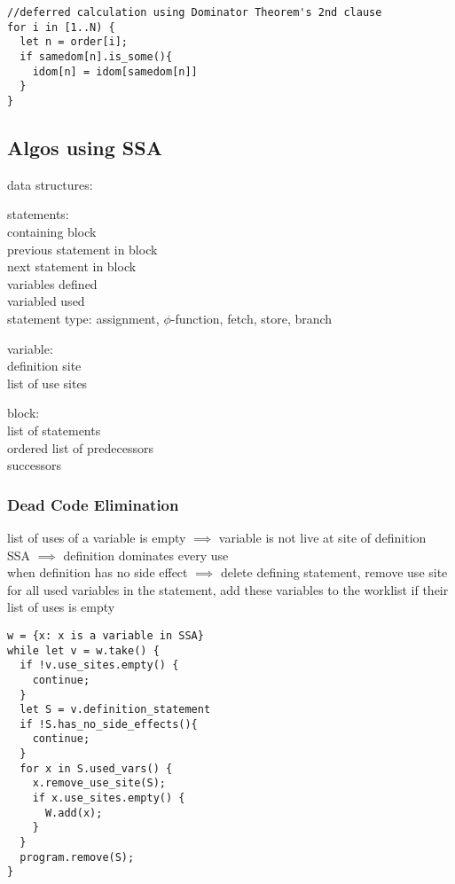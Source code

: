 \documentclass[8pt]{extarticle}
\begin{document}
\begin{multicols*}{2}
\begin{verbatim}
//deferred calculation using Dominator Theorem's 2nd clause
for i in [1..N) {
  let n = order[i];
  if samedom[n].is_some(){
    idom[n] = idom[samedom[n]]
  }
}
\end{verbatim}
 
  \subsection{Algos using SSA}

  data structures:

  statements:\\
  containing block\\
  previous statement in block\\
  next statement in block\\
  variables defined\\
  variabled used\\
  statement type: assignment, $\phi$-function, fetch, store, branch

  variable:\\
  definition site\\
  list of use sites

  block:\\
  list of statements\\
  ordered list of predecessors\\
  successors

  \subsubsection{Dead Code Elimination}
  
  list of uses of a variable is empty $\implies$ variable is not live at site of definition\\
  SSA $\implies$ definition dominates every use\\
  when definition has no side effect $\implies$ delete defining statement, remove use site for all used variables in the statement, add these variables to the worklist if their list of uses is empty

\begin{verbatim}
w = {x: x is a variable in SSA}
while let v = w.take() {
  if !v.use_sites.empty() {
    continue;
  }
  let S = v.definition_statement
  if !S.has_no_side_effects(){
    continue;
  }
  for x in S.used_vars() {
    x.remove_use_site(S);
    if x.use_sites.empty() {
      W.add(x);
    }
  }
  program.remove(S);
}
\end{verbatim}


\end{multicols*}
\end{document}
